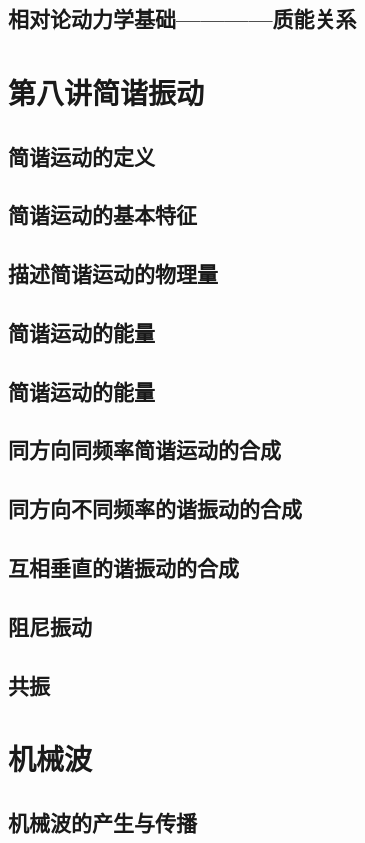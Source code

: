 \documentclass[UTF8]{article}
\begin{document}
\subsection{相对论动力学基础————质能关系}
\section{第八讲\;\;简谐振动}
\subsection{简谐运动的定义}
\subsection{简谐运动的基本特征}
\subsection{描述简谐运动的物理量}
\subsection{简谐运动的能量}
\subsection{简谐运动的能量}
\subsection{同方向同频率简谐运动的合成}
\subsection{同方向不同频率的谐振动的合成}
\subsection{互相垂直的谐振动的合成}
\subsection{阻尼振动}
\subsection{共振}
\section{机械波}
\subsection{机械波的产生与传播}
\end{document}
